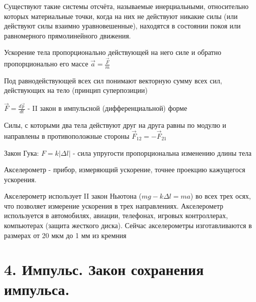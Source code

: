 \documentclass[12pt]{article}
\begin{document}
    \begin{tcolorbox}[colframe=green!25, colback=green!10, title=\textbf{I закон Ньютона}, coltitle=black]
        Существуют такие системы отсчёта, называемые инерциальными, относительно которых материальные точки, когда на них не действуют никакие силы (или действуют силы взаимно уравновешенные), находятся в состоянии покоя или равномерного прямолинейного движения.
    \end{tcolorbox}


    \begin{tcolorbox}[colframe=green!25, colback=green!10, title=\textbf{II закон Ньютона}, coltitle=black]
        Ускорение тела пропорционально действующей на него силе и обратно пропорционально его массе $\vec{a} = \frac{\vec{F}}{m}$
    \end{tcolorbox}

    Под равнодействующей всех сил понимают векторную сумму всех сил, действующих на тело (принцип суперпозиции)

    $\vec{F} = \frac{d\vec{p}}{dt}$ - II закон в импульсной (дифференциальной) форме

    \begin{tcolorbox}[colframe=green!25, colback=green!10, title=\textbf{III закон Ньютона}, coltitle=black]
        Силы, с которыми два тела действуют друг на друга равны по модулю и направлены в противоположные стороны $\vec{F}_{12} = -\vec{F}_{21}$
    \end{tcolorbox}

    Закон Гука: $F = k|\Delta l|$ - сила упругости пропорциональна изменению длины тела

    Акселерометр - прибор, измеряющий ускорение, точнее проекцию кажущегося ускорения.

    Акселерометр использует II закон Ньютона ($mg - k\Delta l = ma$) во всех трех осях, что позволяет
    измерение ускорения в трех направлениях. Акселерометр используется в автомобилях, авиации, телефонах,
    игровых контроллерах, компьютерах (защита жесткого диска). Сейчас акселерометры изготавливаются
    в размерах от 20 мкм до 1 мм из кремния


    \section{4.
    Импульс. Закон сохранения импульса.}
\end{document}
